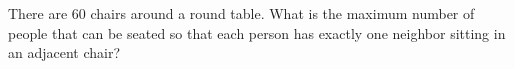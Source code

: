 There are $60$ chairs around a round table. What is the maximum number of people that can be seated so that each person has exactly one neighbor sitting in an adjacent chair?
